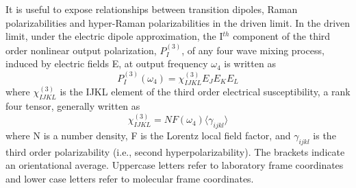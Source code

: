 \documentclass[aip, jcp, reprint, onecolumn]{revtex4-2}
\begin{document}
It is useful to expose relationships between transition dipoles, Raman polarizabilities and hyper-Raman polarizabilities in the driven limit. \cite{Simpson2004, RN120}
In the driven limit, under the electric dipole approximation, the I$^{th}$ component of the third order nonlinear output polarization, ${P}^{(3)}_I$, of any four wave mixing process, induced by electric fields E, at output frequency $\omega_4$ is written as \cite{RN307}
\begin{equation} \label{polarization}
{P}^{(3)}_I (\omega_4)  = \chi^{(3)}_{IJKL} E_J E_K E_L 
\end{equation}
where $\chi^{(3)}_{IJKL}$ is the IJKL element of the third order electrical susceptibility, a rank four tensor, generally written as
\begin{equation}
	\chi^{(3)}_{IJKL} = NF(\omega_4) \langle \gamma_{ijkl} \rangle
\end{equation}
where N is a number density, F is the Lorentz local field factor, and $\gamma_{ijkl}$ is the third order polarizability (i.e., second hyperpolarizability). 
The brackets indicate an orientational average. 
Uppercase letters refer to laboratory frame coordinates and lower case letters refer to molecular frame coordinates.
\end{document}
